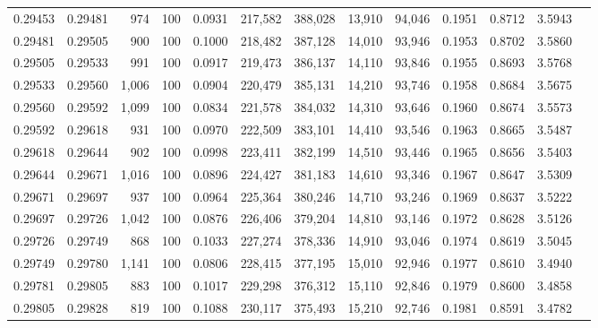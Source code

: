 \begin{tabular}{rrrrrrrrrrrrr}
0.29453 & 0.29481 &   974 & 100 &                                     0.0931 & 217,582 & 388,028 &  13,910 &  94,046 & 0.1951 & 0.8712 & 3.5943 \\
0.29481 & 0.29505 &   900 & 100 &                                     0.1000 & 218,482 & 387,128 &  14,010 &  93,946 & 0.1953 & 0.8702 & 3.5860 \\
0.29505 & 0.29533 &   991 & 100 &                                     0.0917 & 219,473 & 386,137 &  14,110 &  93,846 & 0.1955 & 0.8693 & 3.5768 \\
0.29533 & 0.29560 & 1,006 & 100 &                                     0.0904 & 220,479 & 385,131 &  14,210 &  93,746 & 0.1958 & 0.8684 & 3.5675 \\
0.29560 & 0.29592 & 1,099 & 100 &                                     0.0834 & 221,578 & 384,032 &  14,310 &  93,646 & 0.1960 & 0.8674 & 3.5573 \\
0.29592 & 0.29618 &   931 & 100 &                                     0.0970 & 222,509 & 383,101 &  14,410 &  93,546 & 0.1963 & 0.8665 & 3.5487 \\
0.29618 & 0.29644 &   902 & 100 &                                     0.0998 & 223,411 & 382,199 &  14,510 &  93,446 & 0.1965 & 0.8656 & 3.5403 \\
0.29644 & 0.29671 & 1,016 & 100 &                                     0.0896 & 224,427 & 381,183 &  14,610 &  93,346 & 0.1967 & 0.8647 & 3.5309 \\
0.29671 & 0.29697 &   937 & 100 &                                     0.0964 & 225,364 & 380,246 &  14,710 &  93,246 & 0.1969 & 0.8637 & 3.5222 \\
0.29697 & 0.29726 & 1,042 & 100 &                                     0.0876 & 226,406 & 379,204 &  14,810 &  93,146 & 0.1972 & 0.8628 & 3.5126 \\
0.29726 & 0.29749 &   868 & 100 &                                     0.1033 & 227,274 & 378,336 &  14,910 &  93,046 & 0.1974 & 0.8619 & 3.5045 \\
0.29749 & 0.29780 & 1,141 & 100 &                                     0.0806 & 228,415 & 377,195 &  15,010 &  92,946 & 0.1977 & 0.8610 & 3.4940 \\
0.29781 & 0.29805 &   883 & 100 &                                     0.1017 & 229,298 & 376,312 &  15,110 &  92,846 & 0.1979 & 0.8600 & 3.4858 \\
0.29805 & 0.29828 &   819 & 100 &                                     0.1088 & 230,117 & 375,493 &  15,210 &  92,746 & 0.1981 & 0.8591 & 3.4782 \\

\end{tabular}
